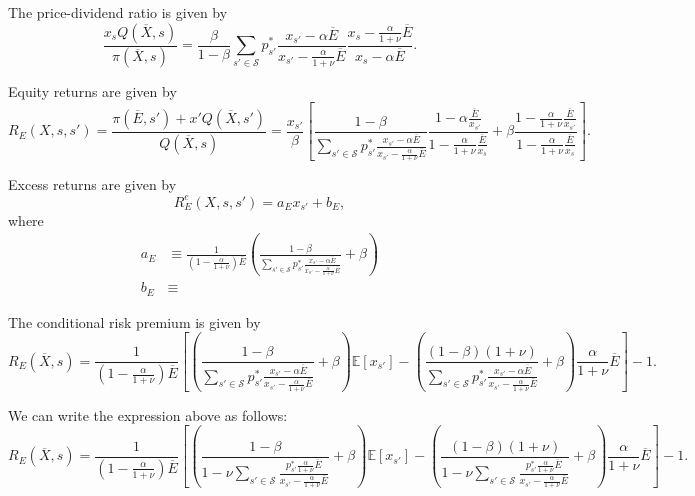 The price-dividend ratio is given by
\begin{equation}
    \frac{x_s Q(\overline{X},s)}{\pi(\overline{X},s)} =  \frac{\beta}{1-\beta} \sum_{s'\in \mathcal{S}} p_{s'}^* \frac{x_{s'} - \alpha \overline{E}}{x_{s'} - \frac{\alpha}{1+\nu}\overline{E}} \frac{x_s - \frac{\alpha}{1+\nu} \overline{E}}{x_s - \alpha\overline{E}}.
\end{equation}

Equity returns are given by
\begin{equation}
    R_E(X,s, s') = \frac{\pi(\overline{E}, s') + x' Q(\overline{X}, s')}{Q(\overline{X}, s)} = \frac{x_{s'}}{\beta}\left[  \frac{1-\beta}{\sum_{s'\in \mathcal{S}} p_{s'}^* \frac{x_{s'} - \alpha \overline{E}}{x_{s'} - \frac{\alpha}{1+\nu}\overline{E}} } \frac{1 - \alpha \frac{\overline{E}}{x_{s'}}}{1 - \frac{\alpha}{1+\nu} \frac{\overline{E}}{x_{s}} } + \beta \frac{1 - \frac{\alpha}{1+\nu} \frac{\overline{E}}{x_{s'}}}{1 - \frac{\alpha}{1+\nu} \frac{\overline{E}}{x_{s}} } \right].
\end{equation}

Excess returns are given by
\begin{equation}
    R_E^e(X,s,s') = a_E x_{s'} + b_E,
\end{equation}
where
\begin{align}
    a_E &\equiv  \frac{1}{\left(1-\frac{\alpha}{1+\nu}\right) \overline{E} } \left( \frac{1-\beta}{\sum_{s'\in \mathcal{S}} p_{s'}^* \frac{x_{s'}  - \alpha \overline{E}}{x_{s'} - \frac{\alpha}{1+\nu}\overline{E}} } + \beta \right)\\
    b_E &\equiv 
\end{align}

The conditional risk premium is given by
\begin{equation}
    R_E(\overline{X},s) = \frac{1}{\left(1-\frac{\alpha}{1+\nu}\right) \overline{E}}\left[ \left( \frac{1-\beta}{\sum_{s'\in \mathcal{S}} p_{s'}^* \frac{x_{s'}  - \alpha \overline{E}}{x_{s'} - \frac{\alpha}{1+\nu}\overline{E}} } + \beta \right) \mathbb{E}[x_{s'}]-\left( \frac{(1-\beta)(1+\nu)}{\sum_{s'\in \mathcal{S}} p_{s'}^* \frac{x_{s'}  - \alpha \overline{E}}{x_{s'} - \frac{\alpha}{1+\nu}\overline{E}} } + \beta \right)  \frac{\alpha}{1+\nu} \overline{E}\right]-1.
\end{equation}

We can write the expression above as follows:
\begin{equation}
    R_E(\overline{X},s) = \frac{1}{\left(1-\frac{\alpha}{1+\nu}\right) \overline{E}}\left[ \left( \frac{1-\beta}{1 - \nu \sum_{s'\in \mathcal{S}} \frac{p_{s'}^* \frac{\alpha}{1+\nu} \overline{E}}{x_{s'} - \frac{\alpha}{1+\nu}\overline{E}} } + \beta \right) \mathbb{E}[x_{s'}]-\left( \frac{(1-\beta)(1+\nu)}{1 - \nu \sum_{s'\in \mathcal{S}} \frac{p_{s'}^* \frac{\alpha}{1+\nu} \overline{E}}{x_{s'} - \frac{\alpha}{1+\nu}\overline{E}}} + \beta \right)  \frac{\alpha}{1+\nu} \overline{E}\right]-1.
\end{equation}




